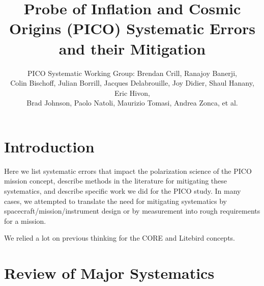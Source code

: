 \documentclass[12pt]{article}
\title{Probe of Inflation and Cosmic Origins (PICO) Systematic Errors and their Mitigation}
\author{PICO Systematic Working Group: Brendan Crill, Ranajoy Banerji, \\ Colin Bischoff, Julian Borrill, 
Jacques Delabrouille, Joy Didier, Shaul Hanany, Eric Hivon, \\Brad Johnson, Paolo Natoli, Maurizio Tomasi, Andrea Zonca, et al.}
\begin{document}


  \maketitle 

\section{Introduction}

Here we list systematic errors that impact the polarization science of the PICO mission concept, describe methods in the literature for mitigating these systematics, and describe specific work we did for the PICO study.  In many cases, we attempted to translate the need for mitigating systematics by spacecraft/mission/instrument design or by measurement into rough requirements for a mission.

We relied a lot on previous thinking for the CORE and Litebird concepts.

\section{Review of Major Systematics}
\end{document}
